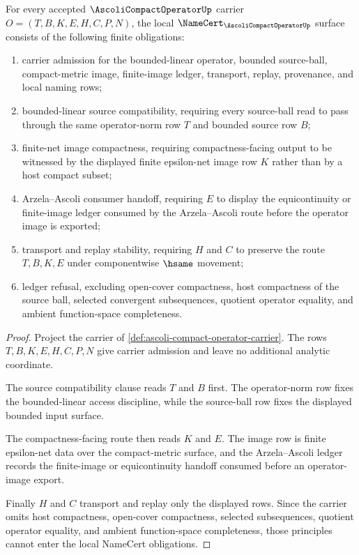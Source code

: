\begin{theorem}
\label{thm:ascoli-compact-operator-namecert-obligations}
For every accepted $\AscoliCompactOperatorUp$ carrier $O=(T,B,K,E,H,C,P,N)$, the local $\NameCert_{\AscoliCompactOperatorUp}$ surface consists of the following finite obligations:
\begin{enumerate}
\item carrier admission for the bounded-linear operator, bounded source-ball, compact-metric image, finite-image ledger, transport, replay, provenance, and local naming rows;
\item bounded-linear source compatibility, requiring every source-ball read to pass through the same operator-norm row $T$ and bounded source row $B$;
\item finite-net image compactness, requiring compactness-facing output to be witnessed by the displayed finite epsilon-net image row $K$ rather than by a host compact subset;
\item Arzela--Ascoli consumer handoff, requiring $E$ to display the equicontinuity or finite-image ledger consumed by the Arzela--Ascoli route before the operator image is exported;
\item transport and replay stability, requiring $H$ and $C$ to preserve the route $T,B,K,E$ under componentwise $\hsame$ movement;
\item ledger refusal, excluding open-cover compactness, host compactness of the source ball, selected convergent subsequences, quotient operator equality, and ambient function-space completeness.
\end{enumerate}
\end{theorem}
\begin{proof}
Project the carrier of \autoref{def:ascoli-compact-operator-carrier}. The rows $T,B,K,E,H,C,P,N$ give carrier admission and leave no additional analytic coordinate.

The source compatibility clause reads $T$ and $B$ first. The operator-norm row fixes the bounded-linear access discipline, while the source-ball row fixes the displayed bounded input surface.

The compactness-facing route then reads $K$ and $E$. The image row is finite epsilon-net data over the compact-metric surface, and the Arzela--Ascoli ledger records the finite-image or equicontinuity handoff consumed before an operator-image export.

Finally $H$ and $C$ transport and replay only the displayed rows. Since the carrier omits host compactness, open-cover compactness, selected subsequences, quotient operator equality, and ambient function-space completeness, those principles cannot enter the local NameCert obligations.
\end{proof}

